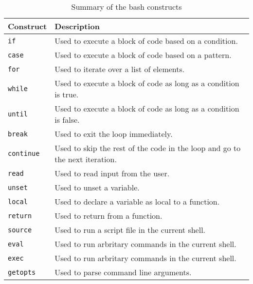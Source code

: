 \begin{table*}[h!]
  \caption{Summary of the bash constructs}
  \begin{tabular}{ll}
    \toprule
    \textbf{Construct} & \textbf{Description} \\
    \midrule
    \lstinline|if| & Used to execute a block of code based on a condition. \\
    \lstinline|case| & Used to execute a block of code based on a pattern. \\
    \lstinline|for| & Used to iterate over a list of elements. \\
    \lstinline|while| & Used to execute a block of code as long as a condition is true. \\
    \lstinline|until| & Used to execute a block of code as long as a condition is false. \\
    \lstinline|break| & Used to exit the loop immediately. \\
    \lstinline|continue| & Used to skip the rest of the code in the loop and go to the next iteration. \\
    \lstinline|read| & Used to read input from the user. \\
    \lstinline|unset| & Used to unset a variable. \\
    \lstinline|local| & Used to declare a variable as local to a function. \\
    \lstinline|return| & Used to return from a function. \\
    \lstinline|source| & Used to run a script file in the current shell. \\
    \lstinline|eval| & Used to run arbritary commands in the current shell. \\
    \lstinline|exec| & Used to run arbritary commands in the current shell. \\
    \lstinline|getopts| & Used to parse command line arguments. \\
    \bottomrule
  \end{tabular}
\end{table*}
